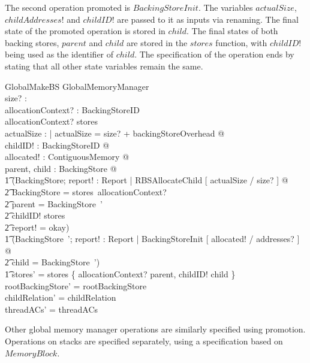 \documentclass[a4paper,10pt]{report}
\begin{document}
The second operation promoted is $BackingStoreInit$. The variables
$actualSize$, $childAddresses!$ and $childID!$ are passed to it as inputs via
renaming. The final state of the promoted operation is stored in $child$.  The final 
states of both backing stores, $parent$ and $child$ are stored in the $stores$
function, with $childID!$ being used as the identifier of $child$. The 
specification of the operation ends by stating that all other state variables
remain the same.
%
\begin{schema}{GlobalMakeBS}
  \Delta GlobalMemoryManager \\
  size? : \nat \\
  allocationContext? : BackingStoreID \\
\where
  allocationContext? \in \dom stores \\
  \exists actualSize : \nat | actualSize = size? + backingStoreOverhead @ \\
  \exists childID! : BackingStoreID @ \\
  \exists allocated! : ContiguousMemory @ \\
  \exists parent, child : BackingStore @ \\
  \t1 (\exists \Delta BackingStore; report! : Report | RBSAllocateChild [ actualSize / size? ] @ \\
    \t2 \theta BackingStore = stores~allocationContext? \land \\
    \t2 parent = \theta BackingStore~' \land \\
    \t2 childID! \notin \dom stores \land \\
    \t2 report! = okay) \land \\
  \t1 (\exists BackingStore~'; report! : Report | BackingStoreInit [ allocated! / addresses? ] @ \\
    \t2 child = \theta BackingStore~') \land \\
  \t1 stores' = stores \oplus \{ allocationContext? \mapsto parent, childID! \mapsto child \} \\
  rootBackingStore' = rootBackingStore \\
  childRelation' = childRelation \\
  threadACs' = threadACs \\
\end{schema}
%
Other global memory manager operations are similarly specified using
promotion. Operations on stacks are specified separately, using a
specification based on $MemoryBlock$.

\end{document}
